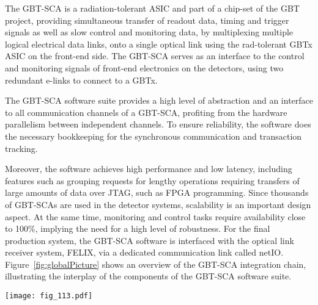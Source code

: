 \documentclass[cernpreprint, atlasdraft=false, UKenglish,british,orcidlogo, texmf, orcidlogo]{atlasdoc}
\begin{document}
 
The \gls{GBT-SCA} is a radiation-tolerant \gls{ASIC} and part of a chip-set of the \gls{GBT} project, providing simultaneous transfer of readout data, timing and trigger signals as well as slow control and monitoring data, by multiplexing multiple logical electrical data links, onto a single optical link using the rad-tolerant \gls{GBTx} \gls{ASIC} on the front-end side.
The \gls{GBT-SCA} serves as an interface to the control and monitoring signals of front-end electronics on the detectors, using two redundant \glspl{e-link} to connect to a \gls{GBTx}.
 
The  \gls{GBT-SCA} software suite \cite{icalepcs2019-wepha102} provides a high level of abstraction and an interface to all communication channels of a \gls{GBT-SCA}, profiting from the hardware parallelism between independent channels. To ensure reliability, the software does the necessary bookkeeping for the synchronous communication and transaction tracking.
 
Moreover, the software achieves high performance and low latency, including features such as grouping requests for lengthy operations requiring transfers of large amounts of data over \gls{JTAG}, such as \gls{FPGA} programming. Since thousands of  \glspl{GBT-SCA} are used in the detector systems, scalability is an important design aspect. At the same time, monitoring and control tasks require availability close to 100\%, implying the need for a high level of robustness. For the final production system, the \gls{GBT-SCA} software is interfaced with the optical link receiver system, \gls{FELIX}, via a dedicated communication link called netIO.
Figure~\ref{fig:globalPicture} shows an overview of the  \gls{GBT-SCA} integration chain, illustrating the interplay of the components of the \gls{GBT-SCA} software suite.
 
\begin{figure*}[!tbh]
\centering
\texttt{[image: fig\_113.pdf]}
\caption{Global picture of the software suite. The \gls{GBT-SCA} Software package, in light blue, comprises the \gls{GBT-SCA} Software \gls{API} to communicate with the  \gls{GBT-SCA} via different back-ends, the \gls{GBT-SCA} Simulator to emulate  \gls{GBT-SCA} traffic for testing and development, and the Demonstrator tools which are used for standalone operations. The \gls{GBT-SCA} \gls{OPC UA} server and its ecosystem, in orange, is the middleware of choice to exchange data with the front-ends. UaoClientForScaOpcUa is a library that clients use to communicate with the  \gls{GBT-SCA} server. Finally, the fwSca module automates the integration of the server data into  \gls{SCADA} systems.}
\label{fig:globalPicture}
\end{figure*}
 
\end{document}

